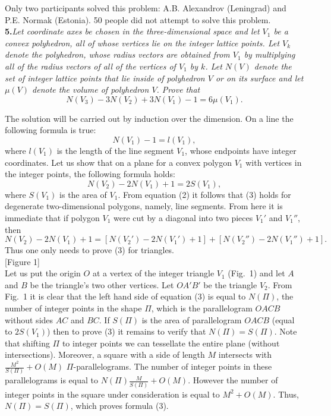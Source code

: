 \documentclass[12pt]{amsart}
\begin{document}
Only two participants solved this problem: A.B. Alexandrov (Leningrad) and P.E.
Normak (Estonia).
50 people did not attempt to solve this problem.\\

\textbf{5.}\quad\textit{Let coordinate axes be chosen in the three-dimensional
space and let $V_1$ be a convex polyhedron, all of whose vertices lie on the
integer lattice points.
Let $V_k$ denote the polyhedron, whose radius vectors are obtained from $V_1$ by
multiplying all of the radius vectors of all of the vertices of $V_1$ by $k$.
Let $N(V)$ denote the set of integer lattice points that lie inside of polyhedron
$V$ or on its surface and let $\mu(V)$ denote the volume of polyhedron $V$.
Prove that}
\begin{equation}
N(V_3)-3N(V_2)+3N(V_1)-1=6\mu(V_1).
\end{equation}

The solution will be carried out by induction over the dimension.
On a line the following formula is true:
\begin{equation}
N(V_1)-1=l(V_1),
\end{equation}
where $l(V_1)$ is the length of the line segment $V_1$, whose endpoints have
integer coordinates.
Let us show that on a plane for a convex polygon $V_1$ with vertices in the
integer points, the following formula holds:
\begin{equation}
N(V_2)-2N(V_1)+1=2S(V_1),
\end{equation}
where $S(V_1)$ is the area of $V_1$.
From equation (2) it follows that (3) holds for degenerate two-dimensional
polygons, namely, line segments.
From here it is immediate that if polygon $V_1$ were cut by a diagonal
into two pieces $V_1'$ and $V_1''$, then
$$N(V_2)-2N(V_1)+1=[N(V_2')-2N(V_1')+1]+[N(V_2'')-2N(V_1'')+1].$$
Thus one only needs to prove (3) for triangles.\\

[Figure 1]\\

Let us put the origin $O$ at a vertex of the integer triangle $V_1$ (Fig.~1) and
let $A$ and $B$ be the triangle's two other vertices.
Let $OA'B'$ be the triangle $V_2$.
From Fig.~1 it is clear that the left hand side of equation (3) is equal to
$N(\Pi)$, the number of integer points in the shape $\Pi$, which is the
parallelogram $OACB$ without sides $AC$ and $BC$.
If $S(\Pi)$ is the area of parallelogram $OACB$ (equal to $2S(V_1)$) then to
prove (3) it remains to verify that $N(\Pi)=S(\Pi)$.
Note that shifting $\Pi$ to integer points we can tessellate the entire plane
(without intersections).
Moreover, a square with a side of length $M$ intersects with
$\displaystyle\frac{M^2}{S(\Pi)}+O(M)$ $\Pi$-parallelograms.
The number of integer points in these parallelograms is equal to
$\displaystyle N(\Pi)\frac{M}{S(\Pi)}+O(M)$.
However the number of integer points in the square under consideration is equal
to $M^2+O(M)$.
Thus, $N(\Pi)=S(\Pi)$, which proves formula (3).\\
\end{document}
